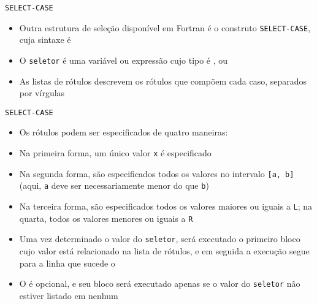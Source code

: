 \begin{frame}[fragile]{\tt SELECT-CASE}

    \begin{itemize}
        \item Outra estrutura de seleção disponível em Fortran é o construto \texttt{SELECT-CASE},
            cuja sintaxe é


        \item O \texttt{seletor} é uma variável ou expressão cujo tipo é ,
             ou 

        \item As listas de rótulos descrevem os rótulos que compõem cada caso, separados por
            vírgulas

    \end{itemize}

\end{frame}

\begin{frame}[fragile]{\tt SELECT-CASE}
    \begin{itemize}
        \item Os rótulos podem ser especificados de quatro maneiras:


        \item Na primeira forma, um único valor \texttt{x} é especificado

        \item Na segunda forma, são especificados todos os valores no intervalo \texttt{[a, b]}
            (aqui, \texttt{a} deve ser necessariamente menor do que \texttt{b})

        \item Na terceira forma, são especificados todos os valores maiores ou iguais a 
            \texttt{L}; na quarta, todos os valores menores ou iguais a \texttt{R}

        \item Uma vez determinado o valor do \texttt{seletor}, será executado o primeiro bloco
            cujo valor está relacionado na lista de rótulos, e em seguida a execução segue para
            a linha que sucede o 

        \item O  é opcional, e seu bloco será executado apenas se
            o valor do \texttt{seletor} não estiver listado em nenhum 
    \end{itemize}

\end{frame}

